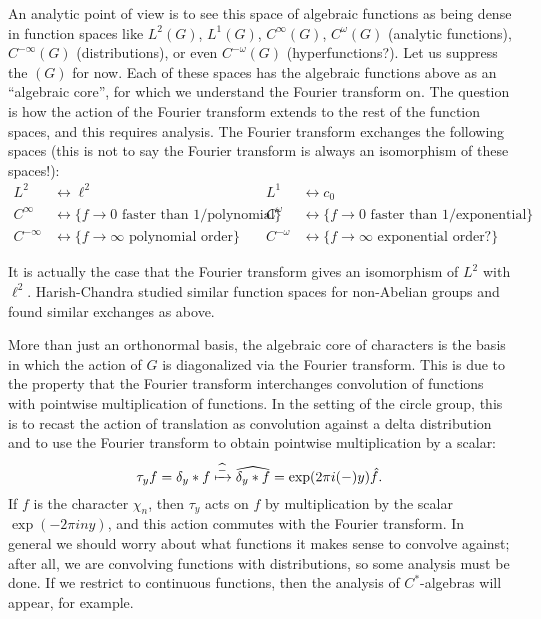 \documentclass[../../rtnotes.tex]{subfiles}
\begin{document}
An analytic point of view is to see this space of algebraic functions as being dense in function spaces like $L^2(G)$, $L^1(G)$, $C^\infty(G)$, $C^\omega(G)$ (analytic functions), $C^{-\infty}(G)$ (distributions), or even $C^{-\omega}(G)$ (hyperfunctions?). Let us suppress the $(G)$ for now. Each of these spaces has the algebraic functions above as an ``algebraic core'', for which we understand the Fourier transform on. The question is how the action of the Fourier transform extends to the rest of the function spaces, and this requires analysis. The Fourier transform exchanges the following spaces (this is not to say the Fourier transform is always an isomorphism of these spaces!):
\begin{align*}
	L^2 &\longleftrightarrow \ell^2 & L^1 &\longleftrightarrow c_0\\
	C^\infty &\longleftrightarrow \{f\to 0 \text{ faster than } 1/\text{polynomial}\} & C^\omega &\longleftrightarrow \{f\to 0 \text{ faster than } 1/\text{exponential}\}\\
	C^{-\infty} &\longleftrightarrow \{f\to \infty \text{ polynomial order}\} & C^{-\omega} &\longleftrightarrow \{f\to \infty \text{ exponential order?}\}
\end{align*}

It is actually the case that the Fourier transform gives an isomorphism of $L^2$ with $\ell^2$. Harish-Chandra studied similar function spaces for non-Abelian groups and found similar exchanges as above.

More than just an orthonormal basis, the algebraic core of characters is the basis in which the action of $G$ is diagonalized via the Fourier transform. This is due to the property that the Fourier transform interchanges convolution of functions with pointwise multiplication of functions. In the setting of the circle group, this is to recast the action of translation as convolution against a delta distribution and to use the Fourier transform to obtain pointwise multiplication by a scalar:
\[\tau_yf = \delta_y\ast f\xmapsto{\widehat{-}} \widehat{\delta_y\ast f} = \exp(2\pi i(-)y)\hat f.\]
If $f$ is the character $\chi_n$, then $\tau_y$ acts on $f$ by multiplication by the scalar $\exp(-2\pi iny)$, and this action commutes with the Fourier transform. In general we should worry about what functions it makes sense to convolve against; after all, we are convolving functions with distributions, so some analysis must be done. If we restrict to continuous functions, then the analysis of $C^\ast$-algebras will appear, for example.
\end{document}

